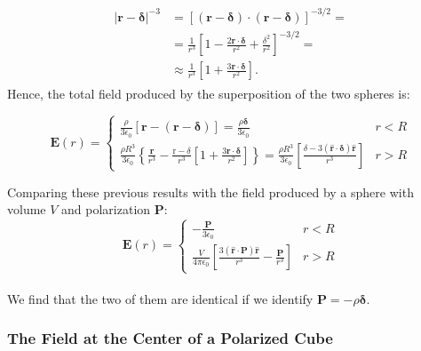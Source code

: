 \begin{equation}
	\begin{split}
		\begin{aligned}
			|\mathbf{r}-\boldsymbol{\delta}|^{-3} &=[(\mathbf{r}-\boldsymbol{\delta}) \cdot(\mathbf{r}-\boldsymbol{\delta})]^{-3 / 2} =\\
			&=\frac{1}{r^{3}}\left[1-\frac{2 \mathbf{r} \cdot \boldsymbol{\delta}}{r^{2}}+\frac{\delta^{2}}{r^{2}}\right]^{-3 / 2} =\\
			& \approx \frac{1}{r^{3}}\left[1+\frac{3 \mathbf{r} \cdot \boldsymbol{\delta}}{r^{2}}\right].
		\end{aligned}
	\end{split}
\end{equation}
Hence, the total field produced by the superposition of the two spheres is:

\begin{equation}
	\mathbf{E}(r)=\left\{\begin{array}{ll}
		\frac{\rho}{3 \epsilon_{0}}[\mathbf{r}-(\mathbf{r}-\boldsymbol{\delta})]=\frac{\rho \boldsymbol{\delta}}{3 \epsilon_{0}} & r<R \\
		\frac{\rho R^{3}}{3 \epsilon_{0}}\left\{\frac{\mathbf{r}}{r^{3}}-\frac{\mathrm{r}-\delta}{r^{3}}\left[1+\frac{3 \mathbf{r} \cdot \boldsymbol{\delta}}{r^{2}}\right]\right\}=\frac{\rho R^{3}}{3 \epsilon_{0}}\left[\frac{\delta-3(\hat{\mathbf{r}} \cdot \boldsymbol{\delta}) \hat{\mathbf{r}}}{r^{3}}\right] & r>R
	\end{array}\right.
\end{equation}

Comparing these previous results with the field produced by a sphere with volume $V$ and polarization
$\mathbf{P}:$
\begin{equation}
	\mathbf{E}(r)=\left\{\begin{array}{ll}
		-\frac{\mathbf{P}}{3 \epsilon_{0}} & r<R \\
		\frac{V}{4 \pi \epsilon_{0}}\left[\frac{3(\hat{\mathbf{r}} \cdot \mathbf{P}) \hat{\mathbf{r}}}{r^{3}}-\frac{\mathbf{P}}{r^{3}}\right] & r>R
	\end{array}\right.
\end{equation}\\
We find that the two of them are identical if we identify $\mathbf{P}=-\rho \boldsymbol{\delta}$.


\subsubsection{The Field at the Center of a Polarized Cube}\label{The Field at the Center of a Polarized Cube}

